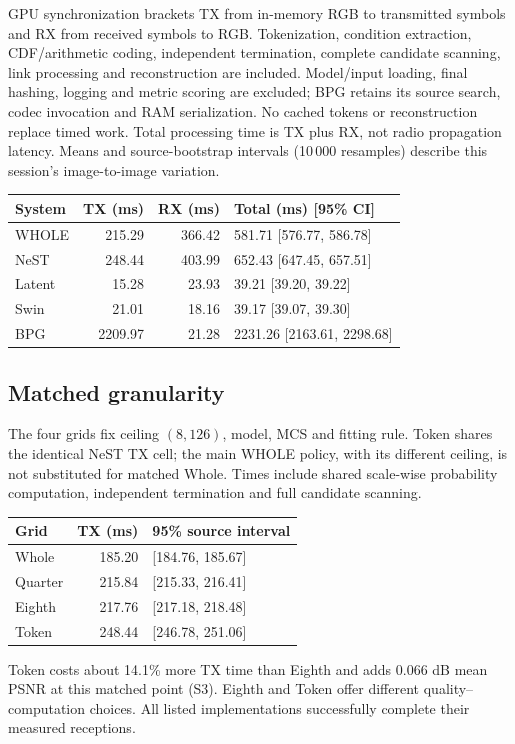 \documentclass[10pt,letterpaper]{article}
\begin{document}
GPU synchronization brackets TX from in-memory RGB to transmitted symbols and RX from received symbols to RGB. Tokenization, condition extraction, CDF/arithmetic coding, independent termination, complete candidate scanning, link processing and reconstruction are included. Model/input loading, final hashing, logging and metric scoring are excluded; BPG retains its source search, codec invocation and RAM serialization. No cached tokens or reconstruction replace timed work. Total processing time is TX plus RX, not radio propagation latency. Means and source-bootstrap intervals (10\,000 resamples) describe this session's image-to-image variation.
\begin{longtable}{@{}lrrl@{}}\toprule
System & TX (ms) & RX (ms) & Total (ms) [95\% CI]\\\midrule\endhead
WHOLE & 215.29 & 366.42 & 581.71 [576.77, 586.78]\\
NeST & 248.44 & 403.99 & 652.43 [647.45, 657.51]\\
Latent & 15.28 & 23.93 & 39.21 [39.20, 39.22]\\
Swin & 21.01 & 18.16 & 39.17 [39.07, 39.30]\\
BPG & 2209.97 & 21.28 & 2231.26 [2163.61, 2298.68]\\
\bottomrule\end{longtable}
\subsection{Matched granularity}\label{sup:timing-grid}
The four grids fix ceiling $(8,126)$, model, MCS and fitting rule. Token shares the identical NeST TX cell; the main WHOLE policy, with its different ceiling, is not substituted for matched Whole. Times include shared scale-wise probability computation, independent termination and full candidate scanning.
\begin{longtable}{@{}lrl@{}}\toprule
Grid & TX (ms) & 95\% source interval\\\midrule\endhead
Whole & 185.20 & [184.76, 185.67]\\
Quarter & 215.84 & [215.33, 216.41]\\
Eighth & 217.76 & [217.18, 218.48]\\
Token & 248.44 & [246.78, 251.06]\\
\bottomrule\end{longtable}
Token costs about 14.1\% more TX time than Eighth and adds 0.066 dB mean PSNR at this matched point (S3). Eighth and Token offer different quality--computation choices. All listed implementations successfully complete their measured receptions.
\end{document}

